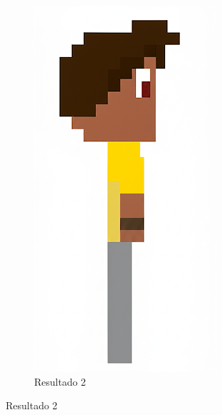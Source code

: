 \begin{figure}[htbp]
\begin{subfigure}{0.23\linewidth}
        \includegraphics[width=1\linewidth]{figs/geminiPro/chat5/tela3_res2.PNG}
        \caption{\small Resultado 2}
        \label{fig:geminiPro9b}
    \end{subfigure}
\end{figure}



